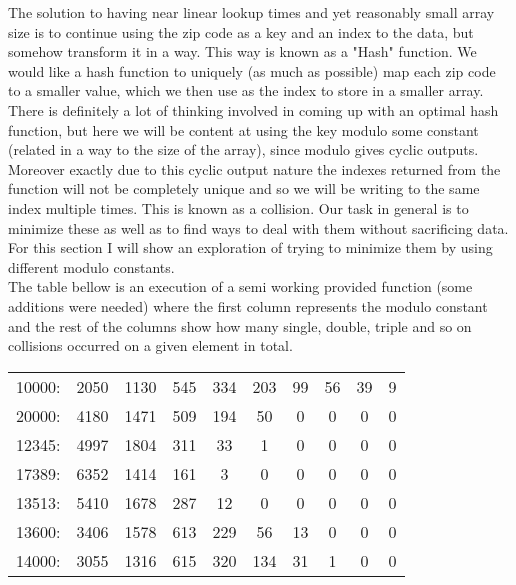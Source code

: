 \documentclass[a4paper,11pt]{article}
\begin{document}
The solution to having near linear lookup times and yet reasonably small array size is to continue using the zip code as a key and an index to the data, but somehow transform it in a way. This way is known as a "Hash" function. We would like a hash function to uniquely (as much as possible) map each zip code to a smaller value, which we then use as the index to store in a smaller array. There is definitely a lot of thinking involved in coming up with an optimal hash function, but here we will be content at using the key modulo some constant (related in a way to the size of the array), since modulo gives cyclic outputs. Moreover exactly due to this cyclic output nature the indexes returned from the function will not be completely unique and so we will be writing to the same index multiple times. This is known as a collision. Our task in general is to minimize these as well as to find ways to deal with them without sacrificing data. For this section I will show an exploration of trying to minimize them by using different modulo constants.
\\

The table bellow is an execution of a semi working provided function (some additions were needed) where the first column represents the modulo constant and the rest of the columns show how many single, double, triple and so on collisions occurred on a given element in total. 

\def\arraystretch{1.5}
\begin{table}[H]
\begin{center}
\begin{tabular}{|lccccccccc|}
\hline
  10000:  & 	2050 & 	1130 & 	545 & 	334 & 	203 & 	99 & 	56 & 	39 & 	9  \\
20000:  & 	4180 & 	1471 & 	509 & 	194 & 	50 & 	0 & 	0 & 	0 & 	0  \\
12345:  & 	4997 & 	1804 & 	311 & 	33 & 	1 & 	0 & 	0 & 	0 & 	0  \\
17389:  & 	6352 & 	1414 & 	161 & 	3 & 	0 & 	0 & 	0 & 	0 & 	0 \\
13513:  & 	5410 & 	1678 & 	287 & 	12 & 	0 & 	0 & 	0 & 	0 & 	0  \\
13600:  & 	3406 & 	1578 & 	613 & 	229 & 	56 & 	13 & 	0 & 	0 & 	0  \\
14000:  & 	3055 & 	1316 & 	615 & 	320 & 	134 & 	31 & 	1 & 	0 & 	0  \\
\hline
\end{tabular}
\label{tab:table1}
\end{center}
\end{table}
\end{document}
